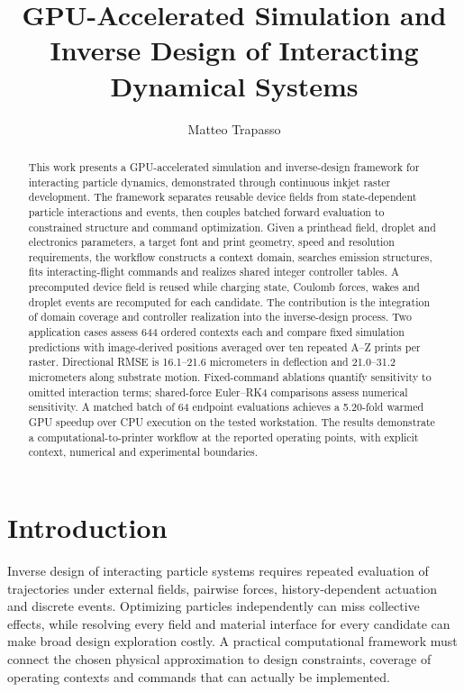 \documentclass[11pt,letterpaper]{article}
\title{GPU-Accelerated Simulation and Inverse Design of Interacting Dynamical Systems}
\author{Matteo Trapasso}
\date{}
\begin{document}
\maketitle
\begin{abstract}
This work presents a GPU-accelerated simulation and inverse-design framework for interacting particle dynamics, demonstrated through continuous inkjet raster development. The framework separates reusable device fields from state-dependent particle interactions and events, then couples batched forward evaluation to constrained structure and command optimization. Given a printhead field, droplet and electronics parameters, a target font and print geometry, speed and resolution requirements, the workflow constructs a context domain, searches emission structures, fits interacting-flight commands and realizes shared integer controller tables. A precomputed device field is reused while charging state, Coulomb forces, wakes and droplet events are recomputed for each candidate. The contribution is the integration of domain coverage and controller realization into the inverse-design process. Two application cases assess 644 ordered contexts each and compare fixed simulation predictions with image-derived positions averaged over ten repeated A--Z prints per raster. Directional RMSE is 16.1--21.6 micrometers in deflection and 21.0--31.2 micrometers along substrate motion. Fixed-command ablations quantify sensitivity to omitted interaction terms; shared-force Euler--RK4 comparisons assess numerical sensitivity. A matched batch of 64 endpoint evaluations achieves a 5.20-fold warmed GPU speedup over CPU execution on the tested workstation. The results demonstrate a computational-to-printer workflow at the reported operating points, with explicit context, numerical and experimental boundaries.
\end{abstract}

\section{Introduction}
Inverse design of interacting particle systems requires repeated evaluation of trajectories under external fields, pairwise forces, history-dependent actuation and discrete events. Optimizing particles independently can miss collective effects, while resolving every field and material interface for every candidate can make broad design exploration costly. A practical computational framework must connect the chosen physical approximation to design constraints, coverage of operating contexts and commands that can actually be implemented.
\end{document}
